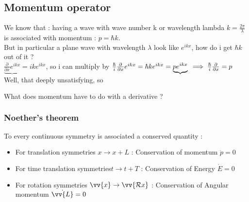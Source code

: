 \documentclass[12pt,oneside]{book}
\begin{document}
\subsection{Momentum operator }
We know that : having a wave with wave number k or  wavelength lambda $k=\frac{2\pi}{\lambda }$ is associated with momentum : $p=\hbar k$.\\
But in particular a plane wave with wavelength $\lambda$ look like $e^{ikx}$, how do i get $\hbar k$ out of it ?\\
$\underbrace{\frac{\partial}{\partial x}e^{ikx}} = ike^{ikx}$, so i can multiply by $\frac{\hbar}{i}\frac{\partial}{\partial x}e^{ikx} = \hbar k e^{ikx} = \underbrace{pe^{ikx}} \\
	\implies \frac{\hbar}{i}\frac{\partial}{\partial x} = p$ \\
Well, that deeply unsatisfying, so
\begin{center}
	What does momentum have to do with a derivative ?
\end{center}
\subsubsection{Noether's theorem}
To every continuous symmetry is associated a conserved quantity :
\begin{itemize}
	\item For translation symmetries $x\to x+L$ : Conservation of momentum $\dot{p} = 0$
	\item For time translation symmetries$t \to t + T$ : Conservation of Energy $\dot{E} = 0$
	\item For rotation symmetries $ \vv{x} \to \vv{\mathcal{R}x} $ : Conservation of Angular momentum $\dot{\vv{L}} = 0$
\end{itemize}
\end{document}
